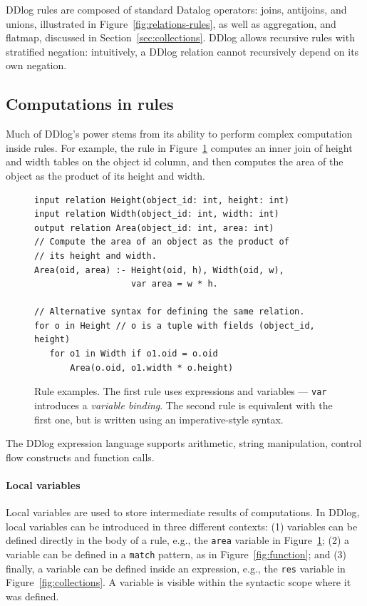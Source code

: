 DDlog rules are composed of standard Datalog operators: joins, antijoins, and
unions, illustrated in Figure~\ref{fig:relations-rules}, as
well as aggregation, and flatmap, discussed in Section~\ref{sec:collections}.
DDlog allows recursive rules with stratified negation: intuitively, a DDlog
relation cannot recursively depend on its own negation.

\subsection{Computations in rules}

Much of DDlog's power stems from its ability to perform complex
computation inside rules.  For example, the rule in
Figure~\ref{fig:area} computes an inner join of height and width
tables on the object id column, and then computes the area of the
object as the product of its height and width.

\begin{figure}[t]
  \footnotesize
  \begin{lstlisting}[language=ddlog]
input relation Height(object_id: int, height: int)
input relation Width(object_id: int, width: int)
output relation Area(object_id: int, area: int)
// Compute the area of an object as the product of
// its height and width.
Area(oid, area) :- Height(oid, h), Width(oid, w),
                   var area = w * h.

// Alternative syntax for defining the same relation.
for o in Height // o is a tuple with fields (object_id, height)
   for o1 in Width if o1.oid = o.oid
       Area(o.oid, o1.width * o.height)
  \end{lstlisting}
  \caption{Rule examples.  The first rule uses expressions and
    variables --- \texttt{var} introduces a \emph{variable binding}.
    The second rule is equivalent with the first one, but is written
    using an imperative-style syntax.\label{fig:area}}
\end{figure}

The DDlog expression language supports arithmetic, string
manipulation, control flow constructs and function calls.

\paragraph{Local variables}
Local variables are used to store intermediate results of
computations.  In DDlog, local variables can be introduced in three
different contexts: (1) variables can be defined directly in the body
of a rule, e.g., the \texttt{area} variable in Figure~\ref{fig:area};
(2) a variable can be defined in a \texttt{match} pattern, as in
Figure~\ref{fig:function}; and (3) finally, a variable can be defined
inside an expression, e.g., the \texttt{res} variable in
Figure~\ref{fig:collections}.  A variable is visible within the
syntactic scope where it was defined.

